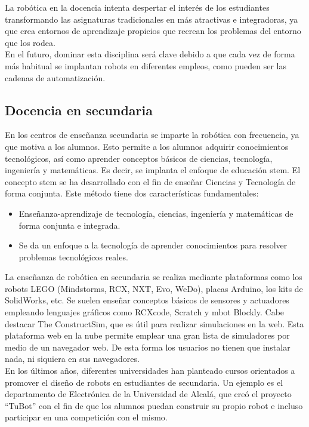 La robótica en la docencia intenta despertar el interés de los estudiantes transformando las asignaturas tradicionales en más atractivas e integradoras, ya que crea entornos de aprendizaje propicios que recrean los problemas del entorno que los rodea.\\

En el futuro, dominar esta disciplina será clave debido a que cada vez de forma más habitual se implantan robots en diferentes empleos, como pueden ser las cadenas de automatización.

\subsection{Docencia en secundaria}

En los centros de enseñanza secundaria se imparte la robótica con frecuencia, ya que motiva a los alumnos. Esto permite a los alumnos adquirir conocimientos tecnológicos, así como aprender conceptos básicos de ciencias, tecnología, ingeniería y matemáticas. Es decir, se implanta el enfoque de educación \acrfull{stem}. El concepto \acrshort{stem} se ha desarrollado con el fin de enseñar Ciencias y Tecnología de forma conjunta. Este método tiene dos características fundamentales:

\begin{itemize}
\item Enseñanza-aprendizaje de tecnología, ciencias, ingeniería y matemáticas de forma conjunta e integrada.
\item Se da un enfoque a la tecnología de aprender conocimientos para resolver problemas tecnológicos reales. 
\end{itemize}

La enseñanza de robótica en secundaria se realiza mediante plataformas como los robots LEGO (Mindstorms, RCX, NXT, Evo, WeDo), placas Arduino, los kits de SolidWorks, etc. Se suelen enseñar conceptos básicos de sensores y actuadores empleando lenguajes gráficos como RCXcode, Scratch y mbot Blockly. Cabe destacar The ConstructSim, que es útil para realizar simulaciones en la web. Esta plataforma web en la nube permite emplear una gran lista de simuladores por medio de un navegador web. De esta forma los usuarios no tienen que instalar nada, ni siquiera en sus navegadores.\\

En los últimos años, diferentes universidades han planteado cursos orientados a promover el diseño de robots en estudiantes de secundaria. Un ejemplo es el departamento de  Electrónica de la Universidad de Alcalá, que creó el proyecto ``TuBot'' con el fin de que los alumnos puedan construir su propio robot e incluso participar en una competición con el mismo.\\

